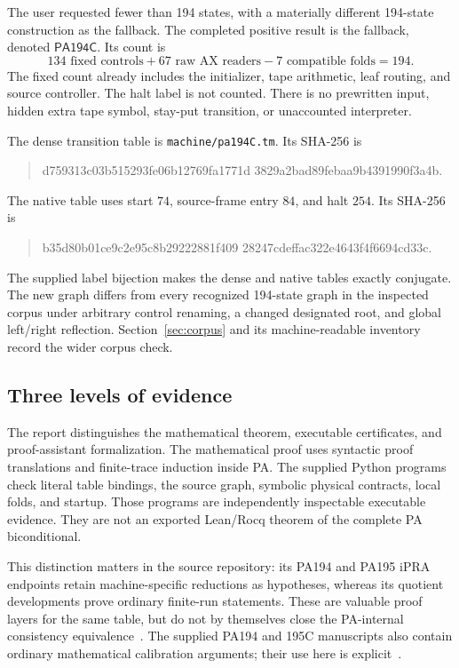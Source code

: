 \documentclass[11pt]{article}
\newcommand{\M}{\mathsf{PA194C}}
\newcommand{\file}[1]{{\small\nolinkurl{#1}}}
\begin{document}
The user requested fewer than 194 states, with a materially different
194-state construction as the fallback. The completed positive result is
the fallback, denoted $\M$. Its count is
\[
\boxed{134\text{ fixed controls}+67\text{ raw AX readers}
       -7\text{ compatible folds}=194.}
\]
The fixed count already includes the initializer, tape arithmetic, leaf
routing, and source controller. The halt label is not counted. There is no
prewritten input, hidden extra tape symbol, stay-put transition, or
unaccounted interpreter.

The dense transition table is \file{machine/pa194C.tm}. Its SHA-256 is
\begin{quote}\small\ttfamily
d759313c03b515293fe06b12769fa1771d\allowbreak
3829a2bad89febaa9b4391990f3a4b.
\end{quote}
The native table uses start $74$, source-frame entry $84$, and halt $254$.
Its SHA-256 is
\begin{quote}\small\ttfamily
b35d80b01ce9c2e95c8b29222881f409\allowbreak
28247cdeffac322e4643f4f6694cd33c.
\end{quote}
The supplied label bijection makes the dense and native tables exactly
conjugate. The new graph differs from every recognized 194-state graph in
the inspected corpus under arbitrary control renaming, a changed designated
root, and global left/right reflection. Section~\ref{sec:corpus} and its
machine-readable inventory record the wider corpus check.

\subsection{Three levels of evidence}

The report distinguishes the mathematical theorem, executable
certificates, and proof-assistant formalization. The mathematical proof
uses syntactic proof translations and finite-trace induction inside PA.
The supplied Python programs check literal table bindings, the source
graph, symbolic physical contracts, local folds, and startup. Those
programs are independently inspectable executable evidence. They are not
an exported Lean/Rocq theorem of the complete PA biconditional.

This distinction matters in the source repository: its PA194 and PA195
iPRA endpoints retain machine-specific reductions as hypotheses, whereas its
quotient developments prove ordinary finite-run statements. These are
valuable proof layers for the same table, but do not by themselves close
the PA-internal consistency equivalence~\cite{pareadme,upstream}.
The supplied PA194 and 195C manuscripts also contain ordinary mathematical
calibration arguments; their use here is explicit~\cite{pa194,pa195c}.
\end{document}
